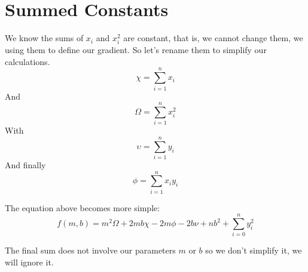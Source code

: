 \documentclass{article}
\begin{document}
\section{Summed Constants}

We know the sums of $x_i$ and $x_i^2$ are constant, that is, we cannot change them, we using them to define our gradient.
So let's rename them to simplify our calculations.
\begin{equation}
\chi = \sum_{i=1}^n x_i
\end{equation}
And
\begin{equation}
\Omega = \sum_{i=1}^n x_i^2
\end{equation}
With
\begin{equation}
\upsilon = \sum_{i=1}^n y_i
\end{equation}
And finally
\begin{equation}
\phi = \sum_{i=1}^n x_i y_i
\end{equation}

The equation above becomes more simple:
\begin{equation}
f(m, b) = m^2 \Omega + 2 m b \chi - 2 m \phi - 2 b \nu + n b^2 + \sum_{i=0}^n y_i^2 
\end{equation}

The final sum does not involve our parameters $m$ or $b$ so we don't simplify it, we will ignore it.
\end{document}
